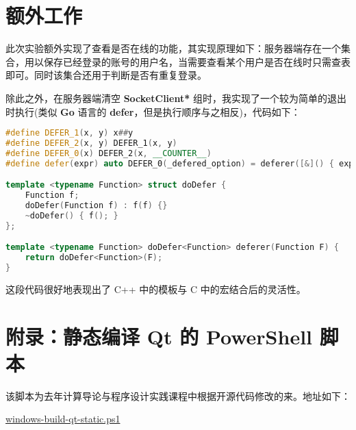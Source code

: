\documentclass[blue,normal,cn]{elegantnote}
\begin{document}
\section{额外工作}
此次实验额外实现了查看是否在线的功能，其实现原理如下：服务器端存在一个集合，用以保存已经登录的账号的用户名，当需要查看某个用户是否在线时只需查表即可。同时该集合还用于判断是否有重复登录。

除此之外，在服务器端清空 \textbf{SocketClient*} 组时，我实现了一个较为简单的退出时执行(类似 \textbf{Go} 语言的 \textbf{defer}，但是执行顺序与之相反)，代码如下：
\begin{lstlisting}[language=C++]
#define DEFER_1(x, y) x##y
#define DEFER_2(x, y) DEFER_1(x, y)
#define DEFER_0(x) DEFER_2(x, __COUNTER__)
#define defer(expr) auto DEFER_0(_defered_option) = deferer([&]() { expr; })

template <typename Function> struct doDefer {
	Function f;
	doDefer(Function f) : f(f) {}
	~doDefer() { f(); }
};

template <typename Function> doDefer<Function> deferer(Function F) {
	return doDefer<Function>(F);
}
\end{lstlisting}
这段代码很好地表现出了 C++ 中的模板与 C 中的宏结合后的灵活性。
\appendix
\section{附录：静态编译 Qt 的 PowerShell 脚本}
该脚本为去年计算导论与程序设计实践课程中根据开源代码修改的来。地址如下：

\href{https://github.com/name1e5s/JobShop/blob/QT/tools/windows-build-qt-static.ps1}{windows-build-qt-static.ps1}
\end{document}
